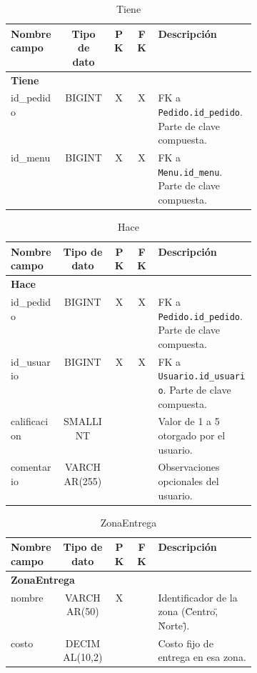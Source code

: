 \documentclass[12pt,a4paper]{article}
\begin{document}
\begin{table}[h!]
\centering
\begin{tabular}{|l|c|c|c|p{0.4\linewidth}|}
\hline
\textbf{Nombre campo}      & \textbf{Tipo de dato} & \textbf{PK} & \textbf{FK} & \textbf{Descripción} \\
\hline
\multicolumn{5}{|l|}{\textbf{Tiene}} \\
\hline
id\_pedido                  & BIGINT                & X           & X           & FK a \texttt{Pedido.id\_pedido}. Parte de clave compuesta. \\
id\_menu                    & BIGINT                & X           & X           & FK a \texttt{Menu.id\_menu}. Parte de clave compuesta. \\
\hline
\end{tabular}
\caption{Tiene}
\label{table:tiene}
\end{table}


\begin{table}[h!]
\centering
\begin{tabular}{|l|c|c|c|p{0.4\linewidth}|}
\hline
\textbf{Nombre campo}      & \textbf{Tipo de dato}   & \textbf{PK} & \textbf{FK} & \textbf{Descripción} \\
\hline
\multicolumn{5}{|l|}{\textbf{Hace}} \\
\hline
id\_pedido                  & BIGINT                 & X           & X           & FK a \texttt{Pedido.id\_pedido}. Parte de clave compuesta. \\
id\_usuario                 & BIGINT                 & X           & X           & FK a \texttt{Usuario.id\_usuario}. Parte de clave compuesta. \\
calificacion                & SMALLINT               &             &             & Valor de 1 a 5 otorgado por el usuario. \\
comentario                  & VARCHAR(255)           &             &             & Observaciones opcionales del usuario. \\
\hline
\end{tabular}
\caption{Hace}
\label{table:hace}
\end{table}


\begin{table}[h!]
\centering
\begin{tabular}{|l|c|c|c|p{0.4\linewidth}|}
\hline
\textbf{Nombre campo}      & \textbf{Tipo de dato} & \textbf{PK} & \textbf{FK} & \textbf{Descripción} \\
\hline
\multicolumn{5}{|l|}{\textbf{ZonaEntrega}} \\
\hline
nombre                      & VARCHAR(50)           & X           &             & Identificador de la zona (\"Centro\", \"Norte\"). \\
costo                       & DECIMAL(10,2)         &             &             & Costo fijo de entrega en esa zona. \\
\hline
\end{tabular}
\caption{ZonaEntrega}
\label{table:zonaentrega}
\end{table}
\end{document}
